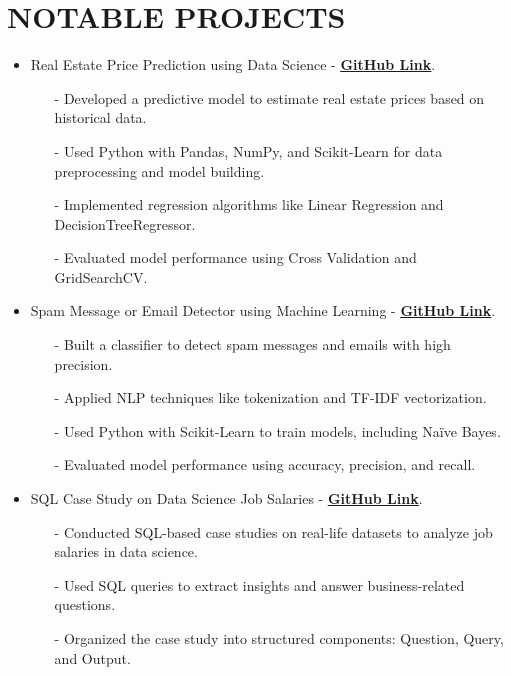 \documentclass[letterpaper,11pt]{article}
\begin{document}
\section*{\textbf{NOTABLE PROJECTS}}
\begin{itemize}[left=0cm]
    \setlength\itemsep{-0.075em} %
    \setlength\parskip{-0.075em} %

    \item Real Estate Price Prediction using Data Science - \href{https://github.com/ShahidulHaqueShaheeen/Real_Estate_Price_Prediction.git}{\underline{\textbf{GitHub Link}}}.
    \begin{itemize}[left=0cm]
        \item[-] \small \justifying Developed a predictive model to estimate real estate prices based on historical data.
        \item[-] \small \justifying Used Python with Pandas, NumPy, and Scikit-Learn for data preprocessing and model building.
        \item[-] \small \justifying Implemented regression algorithms like Linear Regression and DecisionTreeRegressor.
        \item[-] \small \justifying Evaluated model performance using Cross Validation and GridSearchCV.
    \end{itemize}
    
    \item Spam Message or Email Detector using Machine Learning - \href{https://github.com/ShahidulHaqueShaheeen/Spam_MessageOrMail_Detector.git}{\underline{\textbf{GitHub Link}}}.
    \begin{itemize}[left=0cm]
        \item[-] \small \justifying Built a classifier to detect spam messages and emails with high precision.
        \item[-] \small \justifying Applied NLP techniques like tokenization and TF-IDF vectorization.
        \item[-] \small \justifying Used Python with Scikit-Learn to train models, including Naïve Bayes.
        \item[-] \small \justifying Evaluated model performance using accuracy, precision, and recall.
    \end{itemize}

    \item SQL Case Study on Data Science Job Salaries - \href{https://github.com/ShahidulHaqueShaheeen/SQL-Case-Studies.git}{\underline{\textbf{GitHub Link}}}.
    \begin{itemize}[left=0cm]
        \item[-] \small \justifying Conducted SQL-based case studies on real-life datasets to analyze job salaries in data science.
        \item[-] \small \justifying Used SQL queries to extract insights and answer business-related questions.
        \item[-] \small \justifying Organized the case study into structured components: Question, Query, and Output.
    \end{itemize}


\end{itemize}
\end{document}
